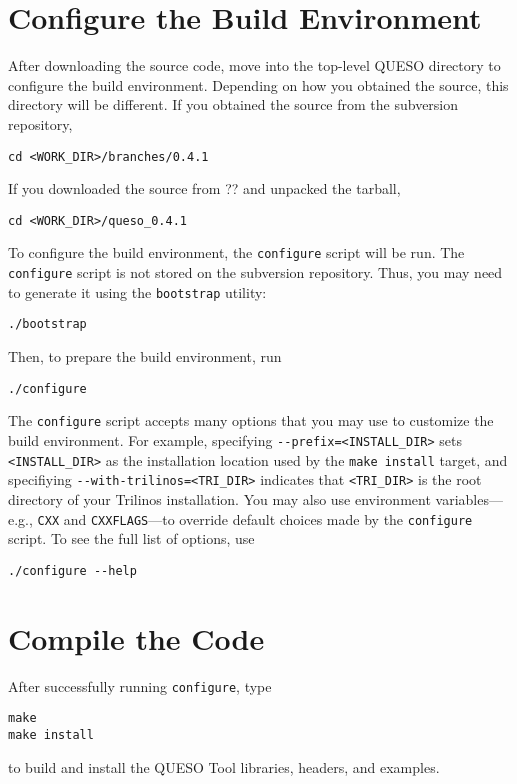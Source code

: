 \section{Configure the Build Environment} \label{section:configure}
After downloading the source code, move into the top-level QUESO
directory to configure the build environment.  Depending on how you
obtained the source, this directory will be different.  If you
obtained the source from the subversion repository,
%
\begin{verbatim}
cd <WORK_DIR>/branches/0.4.1
\end{verbatim}
%
If you downloaded the source from ?? and unpacked the tarball,
%
\begin{verbatim}
cd <WORK_DIR>/queso_0.4.1
\end{verbatim}
%

To configure the build environment, the \verb+configure+ script will
be run.  The \verb+configure+ script is not stored on the subversion
repository.  Thus, you may need to generate it using the
\verb+bootstrap+ utility:
%
\begin{verbatim}
./bootstrap
\end{verbatim}
%
Then, to prepare the build environment, run
%
\begin{verbatim}
./configure
\end{verbatim}
%
The \verb+configure+ script accepts many options that you may use to
customize the build environment.  For example, specifying
\verb+--prefix=<INSTALL_DIR>+ sets \verb+<INSTALL_DIR>+ as the
installation location used by the \verb+make install+ target, and
specifiying \verb+--with-trilinos=<TRI_DIR>+ indicates that
\verb+<TRI_DIR>+ is the root directory of your Trilinos installation.
You may also use environment variables---e.g., \verb+CXX+ and
\verb+CXXFLAGS+---to override default choices made by the
\verb+configure+ script.  To see the full list of options, use
%
\begin{verbatim}
./configure --help
\end{verbatim}
%

\section{Compile the Code} \label{section:compile}
After successfully running \verb+configure+, type
%
\begin{verbatim}
make
make install
\end{verbatim}
%
to build and install the QUESO Tool libraries, headers, and examples.
